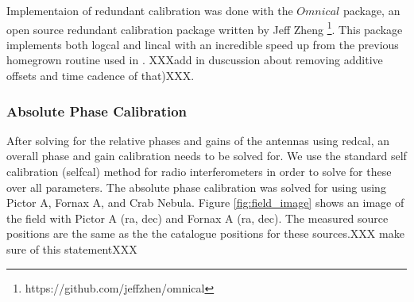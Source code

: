 \documentclass[twocolumn,numberedappendix]{emulateapj}
\begin{document}
Implementaion of redundant calibration was done with the ${Omnical}$ package, an
open source redundant calibration package written by Jeff
Zheng \footnote{https://github.com/jeffzhen/omnical}\cite{zheng_et_al2014}. This
package implements both logcal and lincal with an incredible speed up from
the previous homegrown routine used in \cite{parsons_et_al2014a}. 
XXXadd in duscussion about removing additive offsets and time cadence of
that)XXX.



\subsubsection{Absolute Phase Calibration}
%

After solving for the relative phases and gains of the antennas using redcal, an
overall phase and gain calibration needs to be solved for. We use the standard self
calibration (selfcal) method for radio interferometers in order to solve for
these over all parameters. The absolute phase calibration was solved for using using 
Pictor A, Fornax A, and Crab Nebula. Figure \ref{fig:field_image} shows an
image of the field with Pictor A (ra, dec)  and Fornax A (ra, dec). The
measured source positions are the same as the the catalogue positions for these
sources.XXX make sure of this statementXXX
\end{document}
